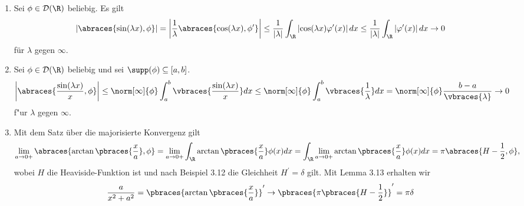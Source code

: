 \begin{solution}
\phantom{}
\begin{enumerate}[label = (\roman*)]
	\item Sei $\phi \in \mathcal{D}(\R)$ beliebig. Es gilt
	\begin{align*}
	\left|\abraces{\sin(\lambda x), \phi}\right| = \left|\frac{1}{\lambda}\abraces{\cos(\lambda x), \phi^\prime}\right| \leq \frac{1}{|\lambda|} \int_\R \left|\cos(\lambda x) \varphi^\prime(x)\right| dx \leq \frac{1}{|\lambda|} \int_\R \left|\varphi^\prime(x)\right| dx \rightarrow 0
	\end{align*}
	für $\lambda$ gegen $\infty$.
	\item Sei $\phi \in \mathcal{D}(\R)$ beliebig und sei $\supp(\phi)\subseteq [a, b]$.
	\begin{align*}
	\left|\abraces{\frac{\sin(\lambda x)}{x}, \phi}\right| \leq \norm[\infty]{\phi}\int_a^b \vbraces{\frac{\sin(\lambda x)}{x}} dx \leq \norm[\infty]{\phi}\int_a^b \vbraces{\frac{1}{\lambda}} dx = \norm[\infty]{\phi} \frac{b - a}{\vbraces{\lambda}} \to 0
	\end{align*}
	f"ur $\lambda$ gegen $\infty$.
	\item Mit dem Satz über die majorisierte Konvergenz gilt
	\begin{align*}
	\lim_{a \to 0+}\abraces{\arctan\pbraces{\frac{x}{a}}, \phi} = \lim_{a \to 0+} \int_\R \arctan\pbraces{\frac{x}{a}} \phi(x) dx = \int_\R \lim_{a \to 0+} \arctan\pbraces{\frac{x}{a}} \phi(x) dx = \pi \abraces{H - \frac{1}{2}, \phi},
	\end{align*}
	wobei $H$ die Heaviside-Funktion ist und nach Beispiel 3.12 die Gleichheit $H^\prime = \delta$ gilt. Mit Lemma 3.13 erhalten wir
	\begin{align*}
	\frac{a}{x^2 + a^2} = \pbraces{\arctan\pbraces{\frac{x}{a}}}^\prime \to \pbraces{\pi\pbraces{H - \frac{1}{2}}}^\prime = \pi \delta
	\end{align*}
\end{enumerate}

\end{solution}

